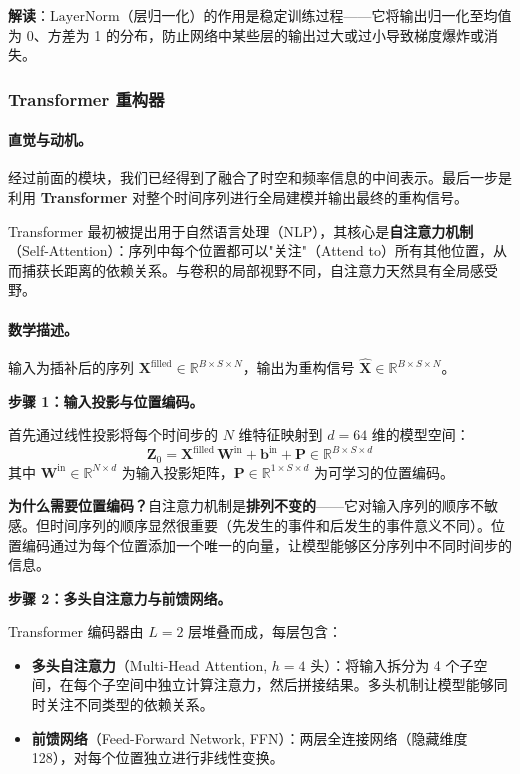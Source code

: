 \documentclass[UTF8]{ctexart}
\begin{document}
\textbf{解读}：$\mathrm{LayerNorm}$（层归一化）的作用是稳定训练过程——它将输出归一化至均值为 0、方差为 1 的分布，防止网络中某些层的输出过大或过小导致梯度爆炸或消失。

\subsubsection{Transformer 重构器}

\paragraph{直觉与动机。}

经过前面的模块，我们已经得到了融合了时空和频率信息的中间表示。最后一步是利用 \textbf{Transformer} 对整个时间序列进行全局建模并输出最终的重构信号。

Transformer 最初被提出用于自然语言处理（NLP），其核心是\textbf{自注意力机制}（Self-Attention）：序列中每个位置都可以"关注"（Attend to）所有其他位置，从而捕获长距离的依赖关系。与卷积的局部视野不同，自注意力天然具有全局感受野。

\paragraph{数学描述。}

输入为插补后的序列 $\mathbf{X}^{\text{filled}} \in \mathbb{R}^{B \times S \times N}$，输出为重构信号 $\hat{\mathbf{X}} \in \mathbb{R}^{B \times S \times N}$。

\textbf{步骤 1：输入投影与位置编码。}

首先通过线性投影将每个时间步的 $N$ 维特征映射到 $d=64$ 维的模型空间：
\begin{equation}
    \mathbf{Z}_0 = \mathbf{X}^{\text{filled}} \, \mathbf{W}^{\text{in}} + \mathbf{b}^{\text{in}} + \mathbf{P} \in \mathbb{R}^{B \times S \times d}
\end{equation}
其中 $\mathbf{W}^{\text{in}} \in \mathbb{R}^{N \times d}$ 为输入投影矩阵，$\mathbf{P} \in \mathbb{R}^{1 \times S \times d}$ 为可学习的位置编码。

\textbf{为什么需要位置编码？}自注意力机制是\textbf{排列不变的}——它对输入序列的顺序不敏感。但时间序列的顺序显然很重要（先发生的事件和后发生的事件意义不同）。位置编码通过为每个位置添加一个唯一的向量，让模型能够区分序列中不同时间步的信息。

\textbf{步骤 2：多头自注意力与前馈网络。}

Transformer 编码器由 $L=2$ 层堆叠而成，每层包含：
\begin{itemize}
    \item \textbf{多头自注意力}（Multi-Head Attention, $h=4$ 头）：将输入拆分为 4 个子空间，在每个子空间中独立计算注意力，然后拼接结果。多头机制让模型能够同时关注不同类型的依赖关系。
    \item \textbf{前馈网络}（Feed-Forward Network, FFN）：两层全连接网络（隐藏维度 128），对每个位置独立进行非线性变换。
\end{itemize}
\end{document}
